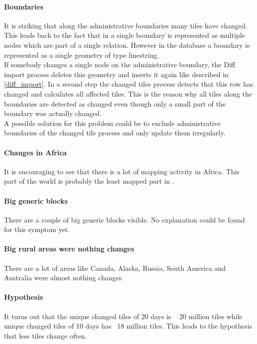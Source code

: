 \paragraph{Boundaries}
It is striking that along the administrative boundaries many tiles have changed. This leads back to the fact that in \osm{} a single boundary is represented as multiple nodes which are part of a single relation. However in the database a boundary is represented as a single geometry of type linestring.\\
If somebody changes a single node on the administrative boundary, the Diff import process deletes this geometry and inserts it again like described in \autoref{diff_import}. In a second step the changed tiles process detects that this row has changed and calculates all affected tiles. This is the reason why all tiles along the boundaries are detected as changed even though only a small part of the boundary was actually changed.\\
A possible solution for this problem could be to exclude administrative boundaries of the changed tile process and only update them irregularly.

\paragraph{Changes in Africa}

It is encouraging to see that there is a lot of mapping activity in Africa. This part of the world is probably the least mapped part in \osm{}.

\paragraph{Big generic blocks}

There are a couple of big generic blocks visible. No explanation could be found for this symptom yet.

\paragraph{Big rural areas were nothing changes}

There are a lot of areas like Canada, Alaska, Russia, South America and Australia were almost nothing changes.

\paragraph{Hypothesis}

It turns out that the unique changed tiles of 20 days is ~ 20 million tiles while unique changed tiles of 10 days has ~18 million tiles. This leads to the hypothesis that less tiles change often.

